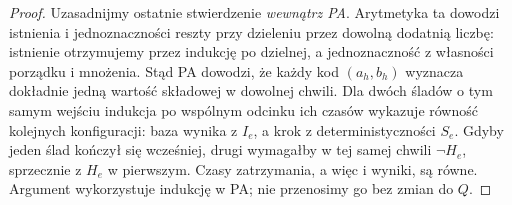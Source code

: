 \begin{proof}
Uzasadnijmy ostatnie stwierdzenie \emph{wewnątrz PA}. Arytmetyka ta dowodzi istnienia i jednoznaczności reszty przy dzieleniu przez dowolną dodatnią liczbę: istnienie otrzymujemy przez indukcję po dzielnej, a jednoznaczność z własności porządku i mnożenia. Stąd PA dowodzi, że każdy kod $(a_h,b_h)$ wyznacza dokładnie jedną wartość składowej w dowolnej chwili. Dla dwóch śladów o tym samym wejściu indukcja po wspólnym odcinku ich czasów wykazuje równość kolejnych konfiguracji: baza wynika z $I_e$, a krok z deterministyczności $S_e$. Gdyby jeden ślad kończył się wcześniej, drugi wymagałby w tej samej chwili $\neg H_e$, sprzecznie z $H_e$ w pierwszym. Czasy zatrzymania, a więc i wyniki, są równe. Argument wykorzystuje indukcję w PA; nie przenosimy go bez zmian do $Q$.
\end{proof}

